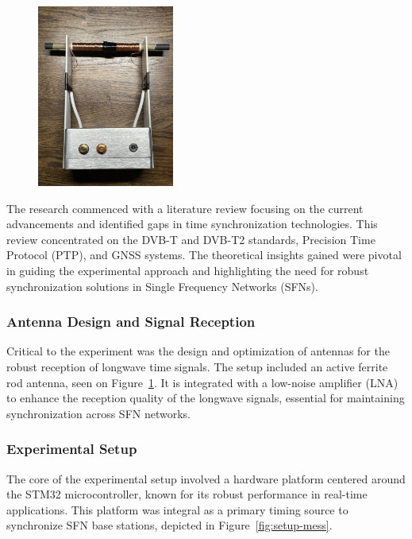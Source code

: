 \documentclass[12pt, a4paper]{extarticle}
\begin{document}
\begin{figure}
    \centering
    \includegraphics[width=0.4\textwidth]{my-antenna.jpg}
    \captionsetup{width=0.4\textwidth}
    \label{fig:my-antenna}
\end{figure}

The research commenced with a literature review focusing on the current
advancements and identified gaps in time synchronization technologies. This
review concentrated on the DVB-T and DVB-T2 standards, Precision Time Protocol
(PTP), and GNSS systems. The theoretical insights gained were pivotal in
guiding the experimental approach and highlighting the need for robust
synchronization solutions in Single Frequency Networks (SFNs).

\subsubsection*{Antenna Design and Signal Reception}

Critical to the experiment was the design and optimization of antennas for the
robust reception of longwave time signals. The setup included an active ferrite
rod antenna, seen on Figure~\ref{fig:my-antenna}. It is integrated with a
low-noise amplifier (LNA) to enhance the reception quality of the longwave
signals, essential for maintaining synchronization across SFN networks.

\subsubsection*{Experimental Setup}

The core of the experimental setup involved a hardware platform centered around
the STM32 microcontroller, known for its robust performance in real-time
applications. This platform was integral as a primary timing source to
synchronize SFN base stations, depicted in Figure~\ref{fig:setup-mess}.
\end{document}
